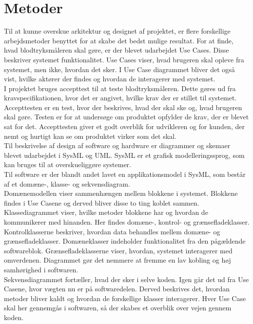 \section{Metoder}
Til at kunne overskue arkitektur og designet af projektet, er flere forskellige arbejdsmetoder benyttet for at skabe det bedst mulige resultat. 
For at finde, hvad blodtryksmåleren skal gøre, er der blevet udarbejdet Use Cases. Disse beskriver systemet funktionalitet. Use Cases viser, hvad brugeren skal opleve fra systemet, men ikke, hvordan det sker. I Use Case diagrammet bliver det også vist, hvilke aktører der findes og hvordan de interagerer med systemet.   \\
I projektet bruges accepttest til at teste blodtryksmåleren. Dette gøres ud fra kravspecifikationen, hvor det er angivet, hvilke krav der er stillet til systemet. \\Accepttesten er en test, hvor der beskrives, hvad der skal ske og, hvad brugeren skal gøre. Testen er for at undersøge om produktet opfylder de krav, der er blevet sat for det. Accepttesten giver et godt overblik for udvikleren og for kunden, der nemt og hurtigt kan se om produktet virker som det skal. \\
\newline
Til  beskrivelse af design af software og hardware er diagrammer og skemaer blevet udarbejdet i SysML og UML. SysML er et grafisk modelleringssprog, som kan bruges til at overskueliggøre systemer. \\
Til software er der blandt andet lavet en applikationsmodel i SysML, som består af et domæne-, klasse- og sekvensdiagram. \\
Domænemodellen viser sammenhængen mellem blokkene i systemet. Blokkene findes i Use Casene og derved bliver disse to ting koblet sammen. \\
Klassediagrammet viser, hvilke metoder blokkene har og hvordan de kommunikerer med hinanden. Her findes domæne-, kontrol- og grænsefladeklasser. Kontrolklasserne beskriver, hvordan data behandles mellem domæne- og grænsefladeklasser. Domæneklasser indeholder funktionalitet fra den pågældende softwareblok. Grænsefladeklasserne viser, hvordan, systemet interagerer med omverdenen. Diagrammet gør det nemmere at fremme en lav kobling og høj samhørighed i softwaren.\\
Sekvensdiagrammet fortæller, hvad der sker i selve koden. Igen går det ud fra Use Casene, hvor vægten nu er på softwaredelen. Derved beskrives det, hvordan metoder bliver kaldt og hvordan de forskellige klasser interagerer. Hver Use Case skal her gennemgås i softwaren, så der skabes et overblik over vejen gennem koden.\\
